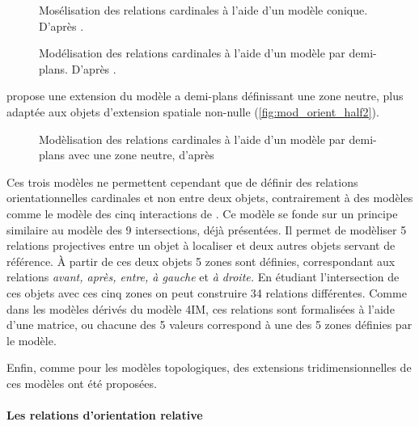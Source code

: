 \begin{figure}
  \centering
    
    \caption{Mosélisation des relations cardinales à l'aide d'un
      modèle conique. D'après \textcite{Renz2004}.}
  \label{fig:mod_orient_cone}
\end{figure}

\begin{figure}
  \centering
    
  \caption{Modélisation des relations cardinales à l'aide d'un modèle
    par demi-plans. D'après \textcite{Frank1992}.}
  \label{fig:mod_orient_half}
\end{figure}


\textcite{Frank1992} propose une extension du modèle a demi-plans
définissant une zone neutre, plus adaptée aux objets d'extension
spatiale non-nulle (\autoref{fig:mod_orient_half2}).

\begin{figure}
  \centering
    
  \caption{Modèlisation des relations cardinales à l'aide d'un modèle
    par demi-plans avec une zone neutre, d'après \textcite{Frank1992}}
  \label{fig:mod_orient_half2}
\end{figure}

Ces trois modèles ne permettent cependant que de définir des relations
orientationnelles cardinales et non entre deux objets, contrairement à
des modèles comme le modèle des cinq interactions de
\textcite{Clementini2006}. Ce modèle se fonde sur un principe
similaire au modèle des 9 intersections, déjà présentées. Il permet de
modèliser 5 relations projectives entre un objet à localiser et deux
autres objets servant de référence. À partir de ces deux objets 5
zones sont définies, correspondant aux relations \emph{avant, après,
  entre, à gauche} et \emph{à droite.} En étudiant l'intersection de
ces objets avec ces cinq zones on peut construire 34 relations
différentes. Comme dans les modèles dérivés du modèle 4IM, ces
relations sont formalisées à l'aide d'une matrice, ou chacune des 5
valeurs correspond à une des 5 zones définies par le modèle.

Enfin, comme pour les modèles topologiques, des extensions
tridimensionnelles de ces modèles ont été proposées.


\paragraph{Les relations d'orientation relative}

